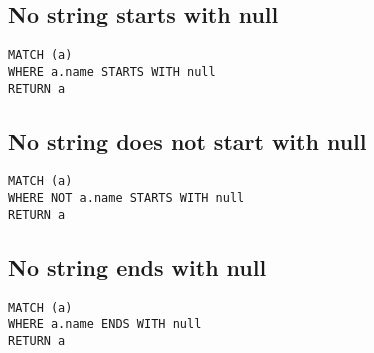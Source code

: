 \subsection{No string starts with null}

\begin{lstlisting}
MATCH (a)
WHERE a.name STARTS WITH null
RETURN a
\end{lstlisting}

\subsection{No string does not start with null}

\begin{lstlisting}
MATCH (a)
WHERE NOT a.name STARTS WITH null
RETURN a
\end{lstlisting}

\subsection{No string ends with null}

\begin{lstlisting}
MATCH (a)
WHERE a.name ENDS WITH null
RETURN a
\end{lstlisting}

